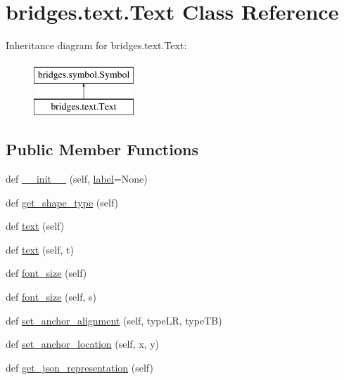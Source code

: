 \hypertarget{classbridges_1_1text_1_1_text}{}\section{bridges.\+text.\+Text Class Reference}
\label{classbridges_1_1text_1_1_text}
Inheritance diagram for bridges.\+text.\+Text\+:\begin{figure}[H]
\begin{center}
\leavevmode
\includegraphics[height=2.000000cm]{classbridges_1_1text_1_1_text}
\end{center}
\end{figure}
\subsection*{Public Member Functions}
\begin{DoxyCompactItemize}
\item 
def \hyperlink{classbridges_1_1text_1_1_text_a730885d64034a8267dc3025b4df49646}{\+\_\+\+\_\+init\+\_\+\+\_\+} (self, \hyperlink{classbridges_1_1symbol_1_1_symbol_a6e29aa07da4ce5b13130ada2688685fc}{label}=None)
\item 
def \hyperlink{classbridges_1_1text_1_1_text_abddf33cfa3916239b5fa9187d5610047}{get\+\_\+shape\+\_\+type} (self)
\item 
def \hyperlink{classbridges_1_1text_1_1_text_aa98886a6c597c12e37831584e33a36a0}{text} (self)
\item 
def \hyperlink{classbridges_1_1text_1_1_text_af204cecbce4b55dff1079ca9f96a309e}{text} (self, t)
\item 
def \hyperlink{classbridges_1_1text_1_1_text_ad2a6dafe36a688451361e73c4958fd82}{font\+\_\+size} (self)
\item 
def \hyperlink{classbridges_1_1text_1_1_text_a4f21ac0034c8afe2b2c4acf6c01b5143}{font\+\_\+size} (self, s)
\item 
def \hyperlink{classbridges_1_1text_1_1_text_aec0fadd0770abaed42d8ded9fb3a05ff}{set\+\_\+anchor\+\_\+alignment} (self, type\+LR, type\+TB)
\item 
def \hyperlink{classbridges_1_1text_1_1_text_a51eb05af4320e71eb6f9b0ee75b05c19}{set\+\_\+anchor\+\_\+location} (self, x, y)
\item 
def \hyperlink{classbridges_1_1text_1_1_text_a6fc914af26faace8ad82fa029a32cb56}{get\+\_\+json\+\_\+representation} (self)
\end{DoxyCompactItemize}
